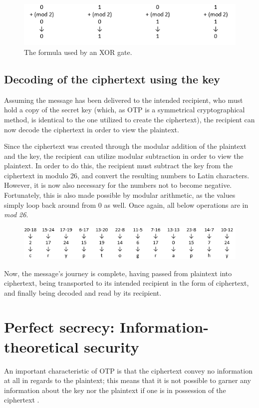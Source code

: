 \documentclass[12pt]{report}
\begin{document}
\begin{figure}[H]
\centering
\includegraphics[scale=1]{XORgate.PNG}
\caption{The formula used by an XOR gate.}
\end{figure}

\subsection{Decoding of the ciphertext using the key}
Assuming the message has been delivered to the intended recipient, who must hold a copy of the secret key (which, as OTP is a symmetrical cryptographical method, is identical to the one utilized to create the ciphertext), the recipient can now decode the ciphertext in order to view the plaintext.

Since the ciphertext was created through the modular addition of the plaintext and the key, the recipient can utilize modular subtraction in order to view the plaintext. In order to do this, the recipient must subtract the key from the ciphertext in modulo 26, and convert the resulting numbers to Latin characters.  However, it is now also necessary for the numbers not to become negative. Fortunately, this is also made possible by modular arithmetic, as the values simply loop back around from 0 as well. Once again, all below operations are in \textit{mod 26}.

\begin{figure}[H]
\centering
\includegraphics[scale=1]{Table4.PNG}
\end{figure}

Now, the message's journey is complete, having passed from plaintext into ciphertext, being transported to its intended recipient in the form of ciphertext, and finally being decoded and read by its recipient. 

\section{Perfect secrecy: Information-theoretical security}
An important characteristic of OTP is that the ciphertext convey no information at all in regards to the plaintext; this means that it is not possible to garner any information about the key nor the plaintext if one is in possession of the ciphertext \cite{PerfectSecrecy} \cite{HandbookOfAppliedCryptography}.
\end{document}
